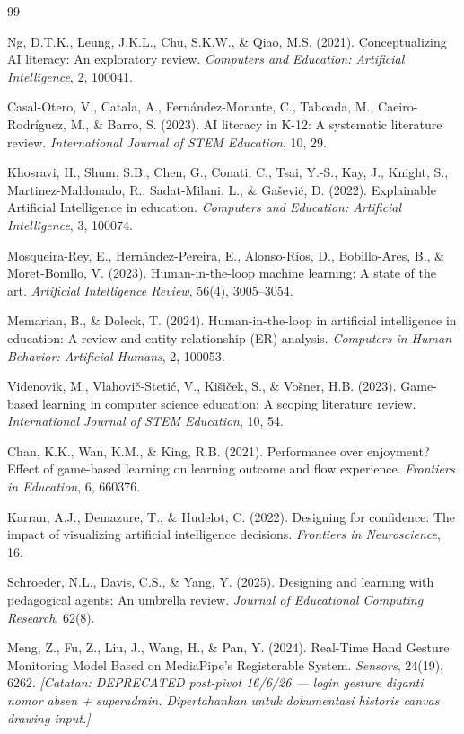\begin{thebibliography}{99}

Ng, D.T.K., Leung, J.K.L., Chu, S.K.W., \& Qiao, M.S. (2021). Conceptualizing AI literacy: An exploratory review. \textit{Computers and Education: Artificial Intelligence}, 2, 100041.

Casal-Otero, V., Catala, A., Fern\'andez-Morante, C., Taboada, M., Caeiro-Rodr\'iguez, M., \& Barro, S. (2023). AI literacy in K-12: A systematic literature review. \textit{International Journal of STEM Education}, 10, 29.

Khosravi, H., Shum, S.B., Chen, G., Conati, C., Tsai, Y.-S., Kay, J., Knight, S., Martinez-Maldonado, R., Sadat-Milani, L., \& Ga\v{s}evi\'c, D. (2022). Explainable Artificial Intelligence in education. \textit{Computers and Education: Artificial Intelligence}, 3, 100074.

Mosqueira-Rey, E., Hern\'andez-Pereira, E., Alonso-R\'ios, D., Bobillo-Ares, B., \& Moret-Bonillo, V. (2023). Human-in-the-loop machine learning: A state of the art. \textit{Artificial Intelligence Review}, 56(4), 3005--3054.

Memarian, B., \& Doleck, T. (2024). Human-in-the-loop in artificial intelligence in education: A review and entity-relationship (ER) analysis. \textit{Computers in Human Behavior: Artificial Humans}, 2, 100053.

Videnovik, M., Vlahovi\v{c}-Steti\'c, V., Kišiček, S., \& Vošner, H.B. (2023). Game-based learning in computer science education: A scoping literature review. \textit{International Journal of STEM Education}, 10, 54.

Chan, K.K., Wan, K.M., \& King, R.B. (2021). Performance over enjoyment? Effect of game-based learning on learning outcome and flow experience. \textit{Frontiers in Education}, 6, 660376.

Karran, A.J., Demazure, T., \& Hudelot, C. (2022). Designing for confidence: The impact of visualizing artificial intelligence decisions. \textit{Frontiers in Neuroscience}, 16.


Schroeder, N.L., Davis, C.S., \& Yang, Y. (2025). Designing and learning with pedagogical agents: An umbrella review. \textit{Journal of Educational Computing Research}, 62(8).

Meng, Z., Fu, Z., Liu, J., Wang, H., \& Pan, Y. (2024). Real-Time Hand Gesture Monitoring Model Based on MediaPipe's Registerable System. \textit{Sensors}, 24(19), 6262. \textit{[Catatan: DEPRECATED post-pivot 16/6/26 --- login gesture diganti nomor absen + superadmin. Dipertahankan untuk dokumentasi historis canvas drawing input.]}


\end{thebibliography}
